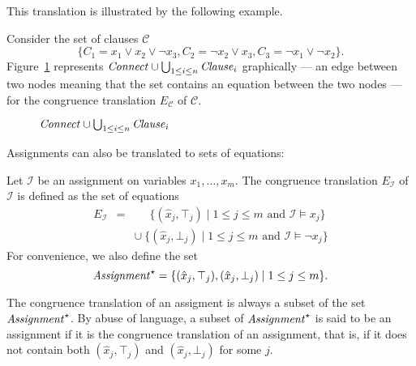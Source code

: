 \documentclass[a4paper,11pt]{article}
\begin{document}
\noindent This translation is illustrated by the following example.

\begin{example}\label{ex:np1}
Consider the set of clauses $\mathcal{C}$
\begin{equation*}
\big\{C_1 = x_1 \vee x_2 \vee \neg x_3, C_2 = \neg x_2 \vee x_3, C_3 = \neg x_1 \vee \neg x_2\big\}.
\end{equation*}
Figure~\ref{fig:npexamplebig} represents ${\it Connect} \cup \bigcup_{1 \leq i \leq n}{\it Clause}_i$
graphically --- an edge between two nodes meaning that the set contains an
equation between the two nodes --- for the congruence translation $E_{\mathcal{C}}$ of
$\mathcal{C}$.

\begin{figure}[ht]

\caption{${\it Connect} \cup \bigcup_{1 \leq i \leq n}{\it Clause}_i$}
\label{fig:npexamplebig}
\end{figure}

\end{example}

Assignments can also be translated to sets of equations:
\begin{definition}
Let $\mathcal{I}$ be an assignment on variables $x_1,\ldots,x_m$.
The congruence translation $E_{\mathcal{I}}$ of $\mathcal{I}$ is defined as the set of equations
\begin{eqnarray*}
  E_{\mathcal{I}} & = & \phantom{\cup}\ \{ (\hat{x}_j,\top_j) \mid 1 \leq j \leq m \text{ and } \mathcal{I} \models x_j \} \\
               &   & \cup\ \{ (\hat{x}_j,\bot_j) \mid 1 \leq j \leq m \text{ and } \mathcal{I} \models \neg x_j \}
\end{eqnarray*}
For convenience, we also define the set
\begin{equation*}
  {\it Assignment}^\star = \{ (\hat{x}_j,\top_j), (\hat{x}_j,\bot_j) \mid 1 \leq j \leq m\}.
\end{equation*}
\end{definition}
\noindent
The congruence translation of an assigment is always a subset of the set
${\it Assignment}^\star$.  By abuse of language, a subset of ${\it Assignment}^\star$ is
said to be an assignment if it is the congruence translation of an assignment,
that is, if it does not contain both $(\hat{x}_j,\top_j)$ and
$(\hat{x}_j,\bot_j)$ for some $j$.
\end{document}
